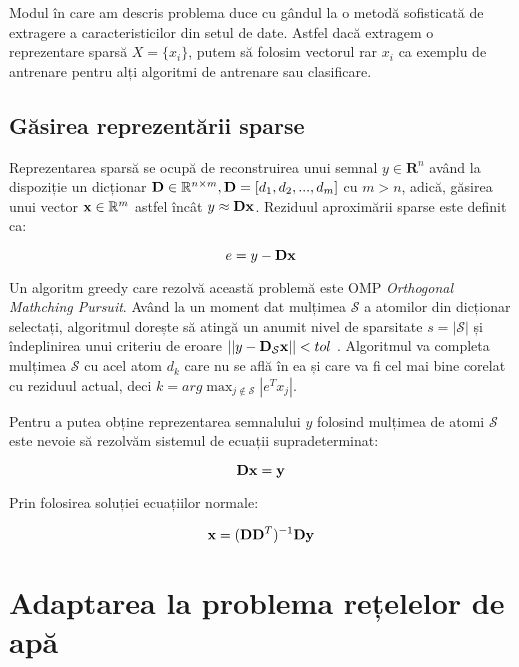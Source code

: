 Modul în care am descris problema duce cu gândul la o metodă sofisticată de extragere a caracteristicilor din setul de date. Astfel dacă extragem o reprezentare sparsă $X = \{x_i\}$, putem să folosim vectorul rar $x_i$ ca exemplu de antrenare pentru alți algoritmi de antrenare sau clasificare.


\subsection{Găsirea reprezentării sparse}
Reprezentarea sparsă se ocupă de reconstruirea unui semnal $y \in \mathbf{R}^n$ având la dispoziție un dicționar $\mathbf{D} \in \mathbb{R}^{n\times m}, \mathbf{D} = [d_1, d_2, ..., d_m]$ cu $m > n$, adică, găsirea unui vector $\mathbf{x} \in \mathbb{R}^m$ astfel încât $y \approx \mathbf{D} \mathbf{x}$. 
Reziduul aproximării sparse este definit ca:

\begin{equation}
    e = y - \mathbf{D} \mathbf{x}
\end{equation}

Un algoritm greedy care rezolvă această problemă este OMP \textit{Orthogonal Mathching Pursuit}. Având la un moment dat mulțimea $\mathcal{S}$ a atomilor din dicționar selectați, algoritmul dorește să atingă un anumit nivel de sparsitate $s = |\mathcal{S}|$ și îndeplinirea unui criteriu de eroare $||y - \mathbf{D_{\mathcal{S}}} \mathbf{x}|| < tol$ \cite[Capitolul 1]{DL_book}. Algoritmul va completa mulțimea $\mathcal{S}$  cu acel atom $d_k$ care nu se află în ea și care va fi cel mai bine corelat cu reziduul actual, deci $k = arg \max_{j \not \in \mathcal{S}} |e^T x_j|$. 

Pentru a putea obține reprezentarea semnalului $y$ folosind mulțimea de atomi $\mathcal{S}$ este nevoie să rezolvăm sistemul de ecuații supradeterminat:

\begin{equation}
    \mathbf{D} \mathbf{x} = \mathbf{y}
\end{equation}

Prin folosirea soluției ecuațiilor normale:

\begin{equation}
    \mathbf{x} = (\mathbf{D} \mathbf{D}^T)^{-1} \mathbf{D} \mathbf{y}
\end{equation}


\section{Adaptarea la problema rețelelor de apă}

